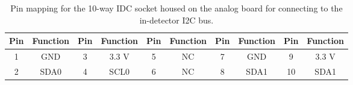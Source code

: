 \documentclass[a4paper]{article}
\begin{document}
\begin{table}[h]
    \begin{center}
        \caption{Pin mapping for the 10-way IDC socket housed on the analog board for connecting to the in-detector I2C bus.}
        \label{tab:IDC10way}
        \begin{tabular}{cc|cc|cc|cc|cc}
            \hline
            \hline
            Pin & Function & Pin & Function & Pin & Function & Pin & Function & Pin & Function \\
            \hline
            1 & GND & 3 & 3.3 V & 5 & NC & 7 & GND & 9 & 3.3 V \\
            2 & SDA0 & 4 & SCL0 & 6 & NC & 8 & SDA1 & 10 & SDA1 \\
            \hline
            \hline
        \end{tabular}
    \end{center}
\end{table}
\end{document}
